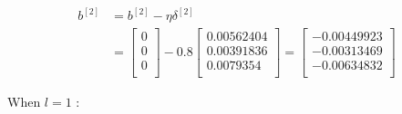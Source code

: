 \documentclass{article}
\begin{document}
\[
    \begin{aligned}
        b^{[2]} & =b^{[2]}-\eta\delta^{[2]} \\
                & =\begin{bmatrix}
                       0 \\
                       0 \\
                       0 \\
                   \end{bmatrix}
        - 0.8 \begin{bmatrix}
                  0.00562404 \\
                  0.00391836 \\
                  0.0079354  \\
              \end{bmatrix}
        = \begin{bmatrix}
              -0.00449923 \\
              -0.00313469 \\
              -0.00634832 \\
          \end{bmatrix}
    \end{aligned}
\]

\noindent When $l = 1$ :
\end{document}
